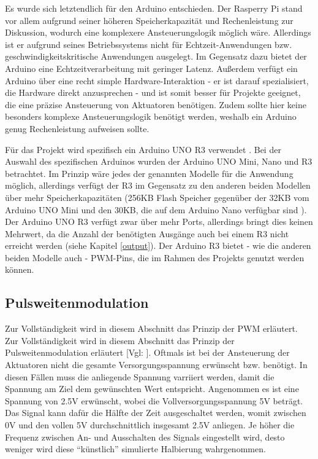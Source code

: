 Es wurde sich letztendlich für den Arduino entschieden.
Der Rasperry Pi stand vor allem aufgrund seiner höheren Speicherkapazität und Rechenleistung zur Diskussion, wodurch eine komplexere Ansteuerungslogik möglich wäre.
Allerdings ist er aufgrund seines Betriebssystems nicht für Echtzeit-Anwendungen bzw. geschwindigkeitskritische Anwendungen ausgelegt.
Im Gegensatz dazu bietet der Arduino eine Echtzeitverarbeitung mit geringer Latenz.
Außerdem verfügt ein Arduino über eine recht simple Hardware-Interaktion - er ist darauf spezialisiert, die Hardware direkt anzusprechen - und ist somit besser für Projekte geeignet, die eine präzise Ansteuerung von Aktuatoren benötigen. %
Zudem sollte hier keine besonders komplexe Ansteuerungslogik benötigt werden, weshalb ein Arduino genug Rechenleistung aufweisen sollte.

Für das Projekt wird spezifisch ein Arduino UNO R3 verwendet \cite[siehe][für die genaue Spezifikation]{ard.ArduinoR3Datasheet.24}.
Bei der Auswahl des spezifischen Arduinos wurden der Arduino UNO Mini, Nano und R3 betrachtet.
Im Prinzip wäre jedes der genannten Modelle für die Anwendung möglich, allerdings verfügt der R3 im Gegensatz zu den anderen beiden Modellen über mehr Speicherkapazitäten (256KB Flash Speicher
gegenüber der 32KB vom Arduino UNO Mini und den 30KB, die auf dem Arduino Nano verfügbar sind \cites[vgl.][]{ard.ArduinoR3Datasheet.24}{ard.ArduinoMiniDatasheet.24}{ard.ArduinoNanoDatasheet.24}).
Der Arduino UNO R3 verfügt zwar über mehr Ports, allerdings bringt dies keinen Mehrwert, da die Anzahl der benötigten Ausgänge auch bei einem R3 nicht erreicht werden
(siehe Kapitel \ref{output}).
Der Arduino R3 bietet - wie die anderen beiden Modelle auch - \ac{PWM}-Pins, die im Rahmen des Projekts genutzt werden können.


\subsection{Pulsweitenmodulation}\label{PWM}

Zur Vollständigkeit wird in diesem Abschnitt das Prinzip der \acf{PWM} erläutert.
Zur Vollständigkeit wird in diesem Abschnitt das Prinzip der Pulsweitenmodulation erläutert [Vgl: \cite*[siehe ][]{PWM}].
Oftmals ist bei der Ansteuerung der Aktuatoren nicht die gesamte Versorgungsspannung erwünscht bzw. benötigt.
In diesen Fällen muss die anliegende Spannung varriiert werden, damit die Spannung am Ziel dem gewünschten Wert entspricht.
Angenommen es ist eine Spannung von 2.5V erwünscht, wobei die Vollversorgungsspannung 5V beträgt.
Das Signal kann dafür die Hälfte der Zeit ausgeschaltet werden, womit zwischen 0V und den vollen 5V durchschnittlich insgesamt 2.5V anliegen.
Je höher die Frequenz zwischen An- und Ausschalten des Signals eingestellt wird, desto weniger wird diese \enquote{künstlich} simulierte Halbierung wahrgenommen.

